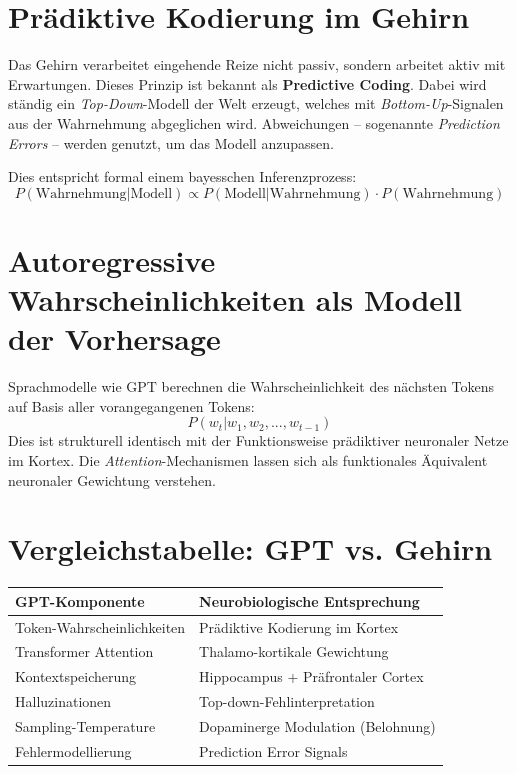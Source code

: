 \section{Prädiktive Kodierung im Gehirn}

Das Gehirn verarbeitet eingehende Reize nicht passiv, sondern arbeitet aktiv mit Erwartungen. Dieses Prinzip ist bekannt als \textbf{Predictive Coding}. Dabei wird ständig ein \textit{Top-Down}-Modell der Welt erzeugt, welches mit \textit{Bottom-Up}-Signalen aus der Wahrnehmung abgeglichen wird. Abweichungen – sogenannte \textit{Prediction Errors} – werden genutzt, um das Modell anzupassen.

Dies entspricht formal einem bayesschen Inferenzprozess:
\[
P(\text{Wahrnehmung}|\text{Modell}) \propto P(\text{Modell}|\text{Wahrnehmung}) \cdot P(\text{Wahrnehmung})
\]

\section{Autoregressive Wahrscheinlichkeiten als Modell der Vorhersage}

Sprachmodelle wie GPT berechnen die Wahrscheinlichkeit des nächsten Tokens auf Basis aller vorangegangenen Tokens:
\[
P(w_t | w_1, w_2, ..., w_{t-1})
\]
Dies ist strukturell identisch mit der Funktionsweise prädiktiver neuronaler Netze im Kortex. Die \textit{Attention}-Mechanismen lassen sich als funktionales Äquivalent neuronaler Gewichtung verstehen.

\section{Vergleichstabelle: GPT vs. Gehirn}

\begin{center}
\begin{tabular}{|l|l|}
\hline
\textbf{GPT-Komponente} & \textbf{Neurobiologische Entsprechung} \\
\hline
Token-Wahrscheinlichkeiten & Prädiktive Kodierung im Kortex \\
Transformer Attention & Thalamo-kortikale Gewichtung \\
Kontextspeicherung & Hippocampus + Präfrontaler Cortex \\
Halluzinationen & Top-down-Fehlinterpretation \\
Sampling-Temperature & Dopaminerge Modulation (Belohnung) \\
Fehlermodellierung & Prediction Error Signals \\
\hline
\end{tabular}
\end{center}

